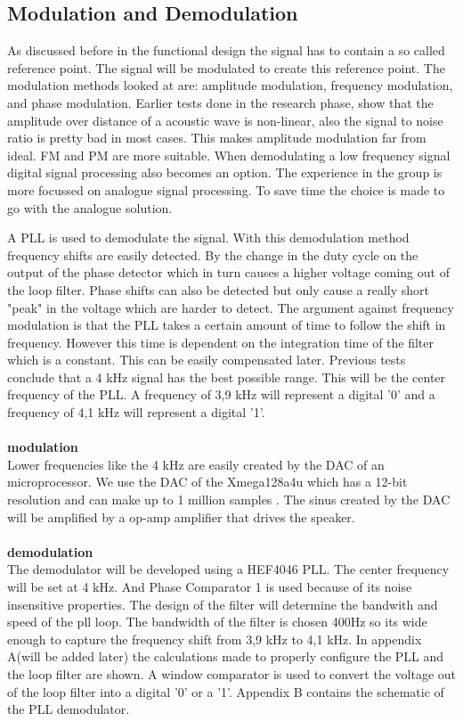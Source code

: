 \documentclass[10pt,a4paper]{article}
\begin{document}
\subsection{Modulation and Demodulation}
As discussed before in the functional design the signal has to contain a so called reference point. The signal will be modulated to create this reference point. The modulation methods looked at are: amplitude modulation, frequency modulation, and phase modulation. Earlier tests done in the research phase, show that the amplitude over distance of a acoustic wave is non-linear, also the signal to noise ratio is pretty bad in most cases. This makes amplitude modulation far from ideal. FM and PM are more suitable. When demodulating a low frequency signal digital signal processing also becomes an option. The experience in the group is more focussed on analogue signal processing. To save time the choice is made to go with the analogue solution. 

A PLL is used to demodulate the signal. With this demodulation method frequency shifts are easily detected. By the change in the duty cycle on the output of the phase detector which in turn causes a higher voltage coming out of the loop filter. Phase shifts can also be detected but only cause a really short "peak" in the voltage which are harder to detect. The argument against frequency modulation is that the PLL takes a certain amount of time to follow the shift in frequency. However this time is dependent on the integration time of the filter which is a constant. This can be easily compensated later. Previous tests conclude that a 4 kHz signal has the best possible range. This will be the center frequency of the PLL. A frequency of 3,9 kHz will represent a digital '0' and a frequency of 4,1 kHz will represent a digital '1'.\\\\
\textbf{modulation}\\
Lower frequencies like the 4 kHz are easily created by the DAC of an microprocessor. We use the DAC of the Xmega128a4u which has a 12-bit resolution and can make up to 1 million samples \cite{xmegadata}. The sinus created by the DAC will be amplified by a op-amp amplifier that drives the speaker.\\\\
\textbf{demodulation}\\
The demodulator will be developed using a HEF4046 PLL. The center frequency will be set at 4 kHz. And Phase Comparator 1 is used because of its noise insensitive properties\cite{plldesign}. The design of the filter will determine the bandwith and speed of the pll loop.\cite{plldavid} The bandwidth of the filter is chosen 400Hz so its wide enough to capture the frequency shift from 3,9 kHz to 4,1 kHz. In appendix A(will be added later) the calculations made to properly configure the PLL and the loop filter are shown. A window comparator is used to convert the voltage out of the loop filter into a digital '0' or a '1'. Appendix B contains the schematic of the PLL demodulator.
\end{document}
